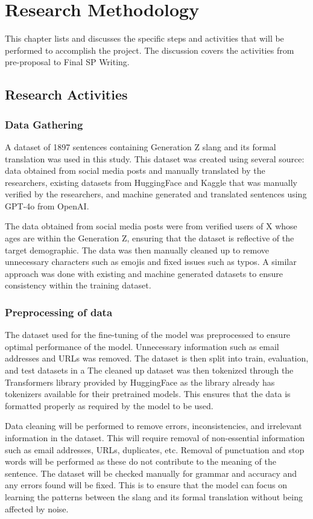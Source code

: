 \chapter{Research Methodology}
This chapter lists and discusses the specific steps and activities that will be performed to accomplish the project. 
The discussion covers the activities from pre-proposal to Final SP Writing.

\section{Research Activities}
\subsection{Data Gathering} 
A dataset of 1897 sentences containing Generation Z slang and its formal translation was used in this study. 
This dataset was created using several source: data obtained from social media posts and manually translated by the researchers, existing datasets from HuggingFace and Kaggle that was manually verified by the researchers, and machine generated and translated sentences using GPT-4o from OpenAI.

The data obtained from social media posts were from verified users of X whose ages are within the Generation Z, ensuring that the dataset is reflective of the target demographic. The data was then manually cleaned up to remove unnecessary characters such as emojis and fixed issues such as typos. A similar approach was done with existing and machine generated datasets to ensure consistency within the training dataset.

\subsection{Preprocessing of data} 
The dataset used for the fine-tuning of the model was preprocessed to ensure optimal performance of the model.
Unnecessary information such as email addresses and URLs was removed. The dataset is then split into train, evaluation, and test datasets in a  The cleaned up dataset was then tokenized through the Transformers library provided by HuggingFace as the library already has tokenizers available for their pretrained models.
This ensures that the data is formatted properly as required by the model to be used.

Data cleaning will be performed to remove errors, inconsistencies, and irrelevant information in the dataset.
This will require removal of non-essential information such as email addresses, URLs, duplicates, etc.
Removal of punctuation and stop words will be performed as these do not contribute to the meaning of the sentence.
The dataset will be checked manually for grammar and accuracy and any errors found will be fixed. 
This is to ensure that the model can focus on learning the patterns between the slang and its formal translation without being affected by noise.

